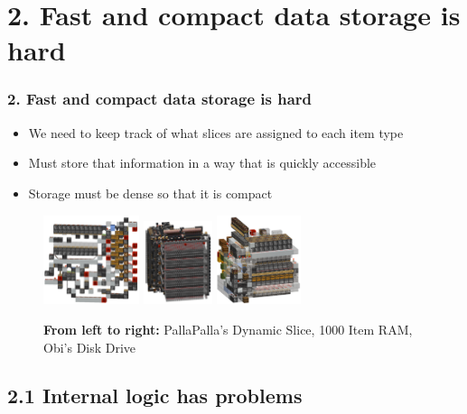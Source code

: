 \documentclass[aspectratio=169]{beamer}
\begin{document}
\section{2. Fast and compact data storage is hard}

\begin{frame}
	\frametitle{2. Fast and compact data storage is hard}

    \begin{itemize}
		\item We need to keep track of what slices are assigned to each item type
        \item Must store that information in a way that is quickly accessible
        \item Storage must be dense so that it is compact
	\end{itemize}

    \begin{figure}
        \includegraphics[width=0.25\textwidth]{pallaslice2.png}
        \hfill
        \includegraphics[width=0.18\textwidth]{bigram.png}
        \hfill
        \includegraphics[width=0.22\textwidth]{diskdrive.png}
        \hfill

        \caption{\textbf{From left to right:} PallaPalla's Dynamic Slice, 1000 Item RAM, Obi's Disk Drive}
	\end{figure}
\end{frame}

\subsection{2.1 Internal logic has problems}
\end{document}

